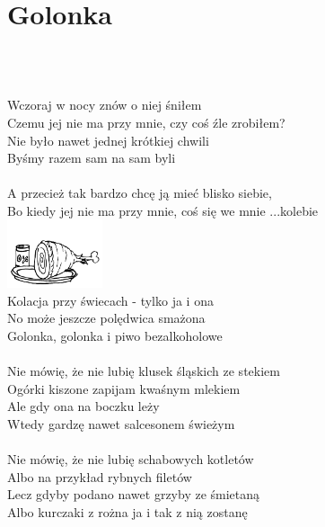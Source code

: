 \documentclass[a5paper, 10pt]{book}
\begin{document}
\section{Golonka}\textcolor{lightgray}{\textit{}}\\~\\
\begin{minipage}[t]{0.8\textwidth}
Wczoraj w nocy znów o niej śniłem\\
Czemu jej nie ma przy mnie, czy coś źle zrobiłem?\\
Nie było nawet jednej krótkiej chwili\\
Byśmy razem sam na sam byli\\
\\
A przecież tak bardzo chcę ją mieć blisko siebie,\\
Bo kiedy jej nie ma przy mnie, coś się we mnie ...kolebie\\
\includegraphics[height=20mm,right]{images/golonka.png}\vspace*{-21mm}\\
Kolacja przy świecach - tylko ja i ona\\
No może jeszcze polędwica smażona\\

\hspace*{5mm}Golonka, golonka i piwo bezalkoholowe\\
\\
Nie mówię, że nie lubię klusek śląskich ze stekiem\\
Ogórki kiszone zapijam kwaśnym mlekiem\\
Ale gdy ona na boczku leży\\
Wtedy gardzę nawet salcesonem świeżym\\
\\
Nie mówię, że nie lubię schabowych kotletów\\
Albo na przykład rybnych filetów\\
Lecz gdyby podano nawet grzyby ze śmietaną\\
Albo kurczaki z rożna ja i tak z nią zostanę\\
\end{minipage}
\end{document}
